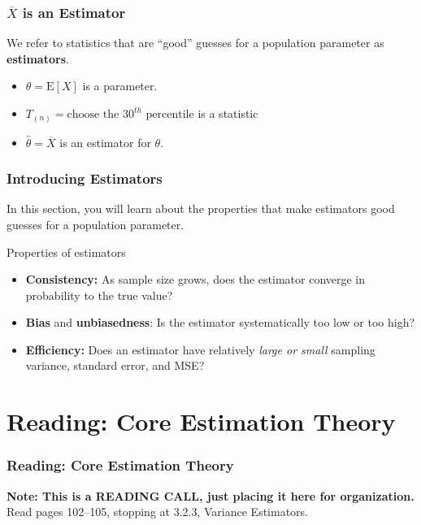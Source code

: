 \documentclass[12pt, block=fill]{beamer}
\newcommand{\E}{\text{E}}
\begin{document}
\begin{frame}
  \frametitle{$\overline{X}$ is an Estimator}
  We refer to statistics that are ``good'' guesses for a population parameter as
  \textbf{estimators}. 
  \begin{itemize}
  \item $\theta = \E[X]$ is a parameter.
  \item$T_{(n)} = \text{choose the 30}^{th} \text{ percentile}$ is a statistic
  \item $\hat \theta = \overline{X}$ is an estimator for $\theta$.
  \end{itemize}
\end{frame}

\begin{frame}
  \frametitle{Introducing Estimators}
  In this section, you will learn about the properties that make
  estimators good guesses for a population parameter.
  \begin{block}{Properties of estimators}
  \begin{itemize}
  \item \textbf{Consistency:} As sample size grows, does the estimator
    converge in probability to the true value? 
  \item \textbf{Bias} and \textbf{unbiasedness}: Is the estimator systematically too low or too
      high?
  \item \textbf{Efficiency:} Does an estimator have relatively
    \textit{large or small} sampling variance, standard error, and
    MSE? 
  \end{itemize}
  \end{block}
\end{frame}

\section{Reading: Core Estimation Theory} 

\begin{frame}
  \frametitle{Reading: Core Estimation Theory}
  \textbf{Note: This is a READING CALL, just placing it here
    for organization.}
  Read pages 102–105, stopping at 3.2.3, Variance Estimators.
\end{frame}
\end{document}
